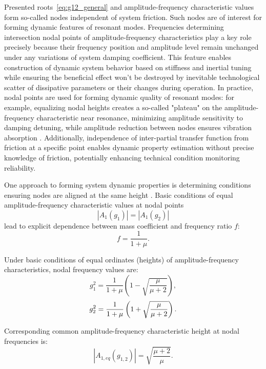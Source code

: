 \documentclass[12pt, a4paper]{article}
\begin{document}
	Presented roots~\eqref{eq:g12_general} and amplitude-frequency characteristic values form so-called nodes independent of system friction. Such nodes are of interest for forming dynamic features of resonant modes. Frequencies determining intersection nodal points of amplitude-frequency characteristics play a key role precisely because their frequency position and amplitude level remain unchanged under any variations of system damping coefficient. This feature enables construction of dynamic system behavior based on stiffness and inertial tuning while ensuring the beneficial effect won't be destroyed by inevitable technological scatter of dissipative parameters or their changes during operation. In practice, nodal points are used for forming dynamic quality of resonant modes: for example, equalizing nodal heights creates a so-called "plateau" on the amplitude-frequency characteristic near resonance, minimizing amplitude sensitivity to damping detuning, while amplitude reduction between nodes ensures vibration absorption \cite{Eliseev2017}. Additionally, independence of inter-partial transfer function from friction at a specific point enables dynamic property estimation without precise knowledge of friction, potentially enhancing technical condition monitoring reliability.
	
	One approach to forming system dynamic properties is determining conditions ensuring nodes are aligned at the same height \cite{DenHartog1956}. Basic conditions of equal amplitude-frequency characteristic values at nodal points
	\begin{equation}
		|A_1(g_1)| = |A_1(g_2)| 
	\end{equation} 
	lead to explicit dependence between mass coefficient and frequency ratio $f$:
	\begin{equation}
		f = \frac{1}{1+\mu}.
		\label{eq:f_opt1}
	\end{equation}
	
	Under basic conditions of equal ordinates (heights) of amplitude-frequency characteristics, nodal frequency values are:
	\begin{equation}
		g_{1}^2 = \frac{1}{1+\mu}\left(1 - \sqrt{\frac{\mu}{\mu+2}}\right),
	\end{equation}		
	\begin{equation}		
		g_{2}^2 = \frac{1}{1+\mu}\left(1 + \sqrt{\frac{\mu}{\mu+2}}\right).
		\label{eq:g12_opt} \\
	\end{equation}
	
	Corresponding common amplitude-frequency characteristic height at nodal frequencies is:
	\begin{equation}
		|A_{1,eq}(g_{1,2})| = \sqrt{\frac{\mu+2}{\mu}}.
		\label{eq:H1_opt}
	\end{equation}
	
\end{document}
